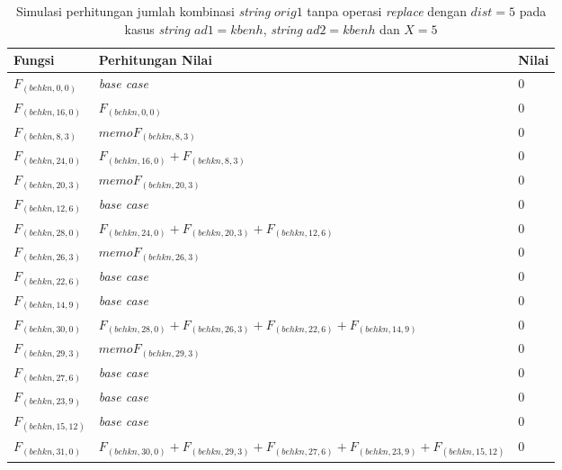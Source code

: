 \begin{appendices}
  \begin{table}[H]
  	\centering
  	\begin{tabular} {|p{3cm}|p{5cm}|p{1cm}|} \hline
  		Fungsi & Perhitungan Nilai & Nilai \\ \hline
  		$ F_{(behkn, 0, 0)} $ & \textit{base case} & $ 0 $ \\ \hline
  		$ F_{(behkn, 16, 0)}  $ & $F_{(behkn, 0, 0)}$ & $ 0 $ \\ \hline
  		$ F_{(behkn, 8, 3)}  $ & $memoF_{(behkn, 8, 3)}$ & $ 0 $ \\ \hline
  		$ F_{(behkn, 24, 0)}  $ & $F_{(behkn, 16, 0)} + F_{(behkn, 8, 3)}$ & $ 0 $ \\ \hline
  		$ F_{(behkn, 20, 3)}  $ & $memoF_{(behkn, 20, 3)}$ & $ 0 $ \\ \hline
  		$ F_{(behkn, 12, 6)} $ & \textit{base case} & $ 0 $ \\ \hline
  		$ F_{(behkn, 28, 0)}  $ & $F_{(behkn, 24, 0)} + F_{(behkn, 20, 3)} + F_{(behkn, 12, 6)}$ & $ 0 $ \\ \hline
  		$ F_{(behkn, 26, 3)}  $ & $memoF_{(behkn, 26, 3)}$ & $ 0 $ \\ \hline
  		$ F_{(behkn, 22, 6)} $ & \textit{base case} & $ 0 $ \\ \hline
  		$ F_{(behkn, 14, 9)} $ & \textit{base case} & $ 0 $ \\ \hline
  		$ F_{(behkn, 30, 0)}  $ & $F_{(behkn, 28, 0)} + F_{(behkn, 26, 3)} + F_{(behkn, 22, 6)} + F_{(behkn, 14, 9)}$ & $ 0 $ \\ \hline
  		$ F_{(behkn, 29, 3)}  $ & $memoF_{(behkn, 29, 3)}$ & $ 0 $ \\ \hline
  		$ F_{(behkn, 27, 6)} $ & \textit{base case} & $ 0 $ \\ \hline
  		$ F_{(behkn, 23, 9)} $ & \textit{base case} & $ 0 $ \\ \hline
  		$ F_{(behkn, 15, 12)} $ & \textit{base case} & $ 0 $ \\ \hline
  		\rowcolor{LightCyan}
  		$ F_{(behkn, 31, 0)}  $ & $F_{(behkn, 30, 0)} + F_{(behkn, 29, 3)} + F_{(behkn, 27, 6)} + F_{(behkn, 23, 9)} + F_{(behkn, 15, 12)}$ & $ 0 $ \\ \hline
  	\end{tabular}\caption{Simulasi perhitungan jumlah kombinasi \textit{string} $ orig1 $ tanpa operasi \textit{replace} dengan $ dist= 5  $ pada kasus \textit{string} $ ad1=kbenh $, \textit{string} $ ad2=kbenh $ dan $ X=5 $}
  	\label{tab:f_3_orig1_5_1}
  \end{table}
  

\end{appendices}
